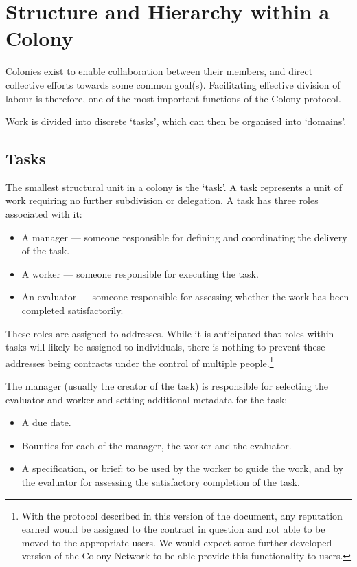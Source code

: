 \section{Structure and Hierarchy within a Colony}\label{sec:colony-structure}
Colonies exist to enable collaboration between their members, and direct collective efforts towards some common goal(s). Facilitating effective division of labour is therefore, one of the most important functions of the Colony protocol.

Work is divided into discrete `tasks', which can then be organised into `domains'.

\subsection{Tasks}\label{sec:tasks}

The smallest structural unit in a colony is the `task'. A task represents a unit of work requiring no further subdivision or delegation. A task has three roles associated with it:
\begin{itemize}
\item A manager --- someone responsible for defining and coordinating the delivery of the task.
\item A worker --- someone responsible for executing the task.
\item An evaluator --- someone responsible for assessing whether the work has been completed satisfactorily.
\end{itemize}

These roles are assigned to addresses. While it is anticipated that roles within tasks will likely be assigned to individuals, there is nothing to prevent these addresses being contracts under the control of multiple people.\footnote{With the protocol described in this version of the document, any reputation earned would be assigned to the contract in question and not able to be moved to the appropriate users. We would expect some further developed version of the Colony Network to be able provide this functionality to users.}

The manager (usually the creator of the task) is responsible for selecting the evaluator and worker and setting additional metadata for the task:

\begin{itemize}
\item A due date.
\item Bounties for each of the manager, the worker and the evaluator.
\item A specification, or brief: to be used by the worker to guide the work, and by the evaluator for assessing the satisfactory completion of the task.
\end{itemize}

